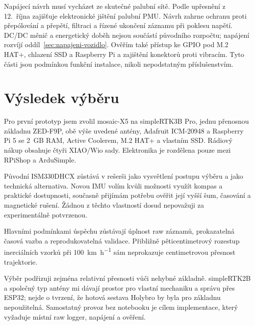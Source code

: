 Napájecí návrh musí vycházet ze skutečné palubní sítě. Podle upřesnění
z 12.~října zajišťuje elektronické jištění palubní PMU. Návrh zahrne
ochranu proti přepólování a přepětí, filtraci a řízené ukončení záznamu při
poklesu napětí. DC/DC měnič a energetický doběh nejsou součástí původního
rozpočtu; napájení rozvíjí oddíl~\ref{sec:napajeni-vozidlo}. Ověřím také přístup ke GPIO pod M.2 HAT+, chlazení SSD
a Raspberry Pi a zajištění konektorů proti vibracím. Tyto části jsou
podmínkou funkční instalace, nikoli nepodstatným příslušenstvím.

\section{Výsledek výběru}

Pro první prototyp jsem zvolil mosaic-X5 na simpleRTK3B Pro, jednu přenosnou
základnu ZED-F9P, obě výše uvedené antény, Adafruit ICM-20948 a Raspberry Pi 5
se 2~GB RAM, Active Coolerem, M.2 HAT+ a vlastním SSD. Rádiový nákup obsahuje
čtyři XIAO/Wio sady. Elektronika je rozdělena pouze mezi RPiShop a ArduSimple.

Původní ISM330DHCX zůstává v rešerši jako vysvětlení postupu výběru a jako
technická alternativa. Novou IMU volím kvůli možnosti využít kompas a
praktické dostupnosti, současně přijímám potřebu ověřit její vyšší šum,
časování a magnetické rušení. Žádnou z těchto vlastností dosud nepovažuji
za experimentálně potvrzenou.

Hlavními podmínkami úspěchu zůstávají úplnost raw záznamů, prokazatelná
časová vazba a reprodukovatelná validace. Přibližně pěticentimetrový
rozestup inerciálních vzorků při \SI{100}{km\per\hour} sám neprokazuje
centimetrovou přesnost trajektorie.

Výběr podřizuji zejména relativní přesnosti vůči nehybné základně.
simpleRTK2B a společný typ antény mi dávají prostor pro vlastní mechaniku
a správu přes ESP32; nejde o tvrzení, že hotová sestava Holybro by byla
pro základnu nepoužitelná. Samostatný provoz bez notebooku je cílem
implementace, který vyžaduje místní raw logger, napájení a ověření.
